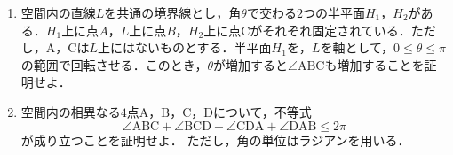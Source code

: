 \documentclass[../../main.tex]{subfiles}
\begin{document}
\begin{enumerate}
  \item 空間内の直線$L$を共通の境界線とし，角$\theta$で交わる$2$つの半平面$H_1$，$H_2$がある．$H_1$上に点$A$，$L$上に点$B$，$H_2$上に点$\mathrm{C}$がそれぞれ固定されている．ただし，$\mathrm{A}$，$\mathrm{C}$は$L$上にはないものとする．半平面$H_1$を，$L$を軸として，$0\le\theta\le\pi$の範囲で回転させる．このとき，$\theta$が増加すると$\angle \mathrm{ABC}$も増加することを証明せよ．
  \item 空間内の相異なる$4$点$\mathrm{A}$，$\mathrm{B}$，$\mathrm{C}$，$\mathrm{D}$について，不等式
    \begin{equation}
      \angle \mathrm{ABC}+\angle \mathrm{BCD}+\angle \mathrm{CDA}+\angle \mathrm{DAB} \le 2\pi
    \end{equation}
    が成り立つことを証明せよ．
    ただし，角の単位はラジアンを用いる．
\end{enumerate}
\end{document}

